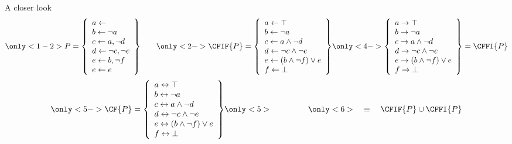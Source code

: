 \begin{frame}{A closer look}
  \[
    \only<1-2>{%
      P
      =
      \left\{
        \begin{array}{l}
          a \leftarrow                \\
          b \leftarrow \neg a         \\
          c \leftarrow a, \neg d      \\
          d \leftarrow \neg c, \neg e \\
          e \leftarrow b, \neg f      \\
          e \leftarrow e
        \end{array}
      \right\}
      \qquad}
    \only<2->{%
      \CFIF{P}
      =
      \left\{
        \begin{array}{l}
          a \leftarrow \top                    \\
          b \leftarrow \neg{a}                 \\
          c \leftarrow a\wedge \neg{d}         \\
          d \leftarrow \neg{c}\wedge \neg{e}   \\
          e \leftarrow (b\wedge \neg{f}) \vee e\\
          f \leftarrow \bot
        \end{array}
      \right\}
    }
    \only<4->{%
      \left\{
        \begin{array}{l}
          a \rightarrow \top                    \\
          b \rightarrow \neg{a}                 \\
          c \rightarrow a\wedge \neg{d}         \\
          d \rightarrow \neg{c}\wedge \neg{e}   \\
          e \rightarrow (b\wedge \neg{f}) \vee e\\
          f \rightarrow \bot
        \end{array}
      \right\}
      =
      \CFFI{P}}
  \]
  \[
    \only<5->{%
      \CF{P}
      =
      \left\{
        \begin{array}{l}
          a \leftrightarrow \top                    \\
          b \leftrightarrow \neg{a}                 \\
          c \leftrightarrow a\wedge \neg{d}         \\
          d \leftrightarrow \neg{c}\wedge \neg{e}   \\
          e \leftrightarrow (b\wedge \neg{f}) \vee e\\
          f \leftrightarrow \bot
        \end{array}
      \right\}}
    \only<5>{\phantom{ = \CF{P} }}
    \only<6>{\quad\equiv\quad\CFIF{P}\cup\CFFI{P}}
  \]
\end{frame}
